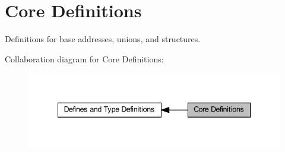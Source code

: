 \hypertarget{group___c_m_s_i_s__core__base}{}\section{Core Definitions}
\label{group___c_m_s_i_s__core__base}


Definitions for base addresses, unions, and structures.  


Collaboration diagram for Core Definitions\+:
\nopagebreak
\begin{figure}[H]
\begin{center}
\leavevmode
\includegraphics[width=341pt]{group___c_m_s_i_s__core__base}
\end{center}
\end{figure}
